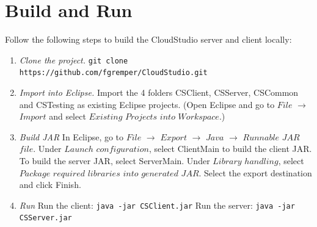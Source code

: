 \section{Build and Run}

Follow the following steps to build the CloudStudio server and client locally:

\begin{enumerate}


\item \emph{Clone the project.} \newline
\texttt{git clone https://github.com/fgremper/CloudStudio.git}
\item \emph{Import into Eclipse.} \newline Import the 4 folders CSClient, CSServer, CSCommon and CSTesting as existing Eclipse projects. (Open Eclipse and go to $File$ $\rightarrow$ $Import$ and select $Existing$ $Projects$ $into$ $Workspace$.)
\item \emph{Build JAR} \newline
In Eclipse, go to $File$ $\rightarrow$ $Export$ $\rightarrow$ $Java$ $\rightarrow$ $Runnable$ $JAR$ $file$.
Under $Launch$ $configuration$, select ClientMain to build the client JAR. To build the server JAR, select ServerMain. Under $Library$ $handling$, select $Package$ $required$ $libraries$ $into$ $generated$ $JAR$.
Select the export destination and click Finish.
\item \emph{Run} \newline
Run the client:
\texttt{java -jar CSClient.jar} \newline
Run the server:
\texttt{java -jar CSServer.jar}

\end{enumerate}

